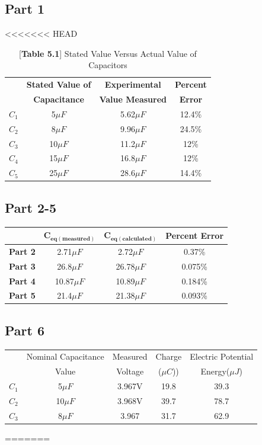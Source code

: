 \documentclass[titlepage]{article}
\begin{document}
	    \subsection{Part 1}
<<<<<<< HEAD
		\begin{table}[h]
			\centering
			\caption*{[\textbf{Table 5.1}] Stated Value Versus Actual Value of Capacitors}
			\begin{tabular}{c|c|c|c}
				&\textbf{Stated Value of} &\textbf{Experimental} &\textbf{Percent}\\
				& \textbf{Capacitance} & \textbf{Value Measured} & \textbf{Error}\\
				\hline
			$C_1$ & 5$\mu F$ & 5.62$\mu F$ & 12.4\% \\ 
			$C_2$ & 8$\mu F$ & 9.96$\mu F$ & 24.5\% \\ 
			$C_3$ & 10$\mu F$ & 11.2$\mu F$ & 12\% \\ 
			$C_4$ & 15$\mu F$ & 16.8$\mu F$ & 12\% \\ 
			$C_5$ & 25$\mu F$ & 28.6$\mu F$ & 14.4\% \\ 
			\end{tabular}
		\end{table}
	    \subsection{Part 2-5} 
		\begin{table}[h]
			\centering
			\begin{tabular}{c|c|c|c}
				& $\bm{C_{eq(measured)}}$ & $\bm{C_{eq(calculated)}}$ & \textbf{Percent Error} \\
				\hline
				\textbf{Part 2} &2.71$\mu F$ &2.72$\mu F$ &0.37\% \\
				\textbf{Part 3} &26.8$\mu F$ &26.78$\mu F$ &0.075\% \\
				\textbf{Part 4} &10.87$\mu F$ &10.89$\mu F$ &0.184\% \\
				\textbf{Part 5} &21.4$\mu F$ &21.38$\mu F$ &0.093\% 
			\end{tabular}
		\end{table}
	    \subsection{Part 6}
		\begin{table}[h]
			\centering
			\begin{tabular}{c|c|c|c|c}
				& Nominal Capacitance & Measured & Charge & Electric Potential\\
				& Value & Voltage &($\mu C$)) & Energy($\mu J$)\\
				\hline
			$C_1$ & 5$\mu F$ & 3.967V& 19.8 & 39.3 \\ 
			$C_2$ & 10$\mu F$ & 3.968V& 39.7 & 78.7 \\ 
			$C_3$ & 8$\mu F$ & 3.967& 31.7 & 62.9\\ 

			\end{tabular}
	   	\end{table} 
=======
\end{document}
